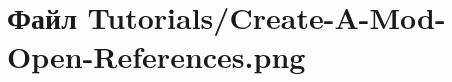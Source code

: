 \hypertarget{_create-_a-_mod-_open-_references_8png}{}\section{Файл Tutorials/\+Create-\/\+A-\/\+Mod-\/\+Open-\/\+References.png}
\label{_create-_a-_mod-_open-_references_8png}

